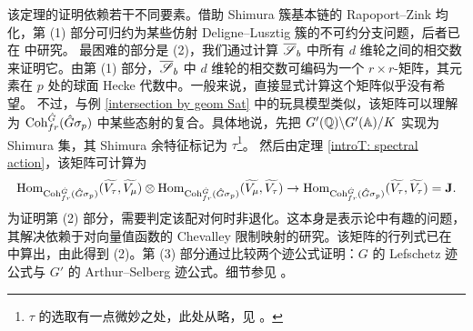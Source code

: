 该定理的证明依赖若干不同要素。借助 Shimura 簇基本链的 Rapoport–Zink 均化，第 (1) 部分可归约为某些仿射 Deligne–Lusztig 簇的不可约分支问题，后者已在 \cite[\S 4]{XZ} 中研究。
最困难的部分是 (2)，我们通过计算 $\overline{\mathscr{S}}_b$ 中所有 $d$ 维轮之间的相交数来证明它。由第 (1) 部分，$\overline{\mathscr{S}}_b$ 中 $d$ 维轮的相交数可编码为一个 $r\times r$-矩阵，其元素在 $p$ 处的球面 Hecke 代数中。一般来说，直接显式计算这个矩阵似乎没有希望。
不过，与例 \ref{intersection by geom Sat} 中的玩具模型类似，该矩阵可以理解为 ${\operatorname{Coh}}^{\hat G}_{fr}(\hat G\sigma_p)$ 中某些态射的复合。具体地说，先把 $G'({\mathbb Q})\backslash G'({\mathbb A})/K$ 实现为 Shimura 集，其 Shimura 余特征标记为 $\tau$\footnote{$\tau$ 的选取有一点微妙之处，此处从略，见 \cite[注 7.4.4]{XZ}。}。
然后由定理 \ref{introT: spectral action}，该矩阵可计算为
\[ {\operatorname{Hom}}_{{\operatorname{Coh}}^{\hat G}_{fr}(\hat G\sigma_p)}(\widetilde{V_{\tau}},\widetilde{V_{\mu}})\otimes  {\operatorname{Hom}}_{{\operatorname{Coh}}^{\hat G}_{fr}(\hat G\sigma_p)}(\widetilde{V_{\mu}},\widetilde{V_{\tau}})\to  {\operatorname{Hom}}_{{\operatorname{Coh}}^{\hat G}_{fr}(\hat G\sigma_p)}(\widetilde{V_{\tau}},\widetilde{V_{\tau}})=\mathbf{J}.\]
为证明第 (2) 部分，需要判定该配对何时非退化。这本身是表示论中有趣的问题，其解决依赖于对向量值函数的 Chevalley 限制映射的研究。该矩阵的行列式已在 \cite{XZ2} 中算出，由此得到 (2)。第 (3) 部分通过比较两个迹公式证明：$G$ 的 Lefschetz 迹公式与 $G'$ 的 Arthur–Selberg 迹公式。细节参见 \cite[\S 2]{XZ}。


